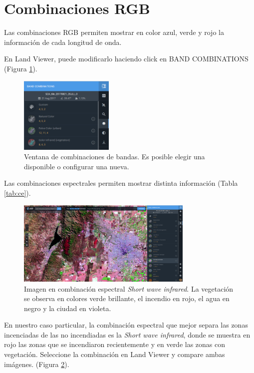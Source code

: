 \documentclass[a4paper,12pt]{book}
\begin{document}
\section{Combinaciones RGB}

Las combinaciones RGB permiten mostrar en color azul, verde y rojo la información de cada longitud de onda.

En Land Viewer, puede modificarlo haciendo click en BAND COMBINATIONS (Figura \ref{fig:bandas}).

\begin{figure}[h!]
    \centering
    \includegraphics[width=0.4\textwidth]{fig:bandas.png}
    \caption{Ventana de combinaciones de bandas. Es posible elegir una disponible o configurar una nueva.}
    \label{fig:bandas}
\end{figure}

Las combinaciones espectrales permiten mostrar distinta información (Tabla \ref{tab:ce}).

\begin{figure}[h!]
    \centering
    \includegraphics[width=0.75\textwidth]{fig:incendio.png}
    \caption{Imagen en combinación espectral \emph{Short wave infrared}. La vegetación se observa en colores verde brillante, el incendio en rojo, el agua en negro y la ciudad en violeta.}
    \label{fig:incendio}
\end{figure}

En nuestro caso particular, la combinación espectral que mejor separa las zonas incenciadas de las no incendiadas es la \emph{Short wave infrared}, donde se muestra en rojo las zonas que se incendiaron recientemente y en verde las zonas con vegetación. Seleccione la combinación en Land Viewer y compare ambas imágenes. (Figura \ref{fig:incendio}).
\end{document}
